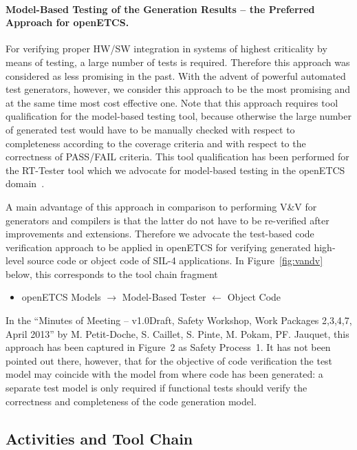 \documentclass[11pt, a4paper]{article}
\begin{document}
 

\paragraph{Model-Based Testing of the Generation Results -- the Preferred Approach for openETCS.}
For verifying proper HW/SW integration in systems of highest criticality by means of testing, a large number of tests is required. Therefore this approach was considered as less promising in the past. With the advent of powerful automated test generators, however, we consider this approach to be the most promising and at the same time most cost effective one. Note that this approach requires tool qualification for the model-based testing tool, because otherwise the large number of generated test would have to be manually checked with respect to completeness according to the coverage criteria and with respect to the correctness of PASS/FAIL criteria. This tool qualification has been performed for the RT-Tester tool which we advocate for model-based testing in the openETCS domain~\cite{rtttq}.

A main advantage of this approach in comparison to performing V\&V for generators and compilers is that the latter do not have to be re-verified after improvements and extensions. Therefore we advocate the test-based code verification approach to be applied in openETCS for verifying generated high-level source code or object code of SIL-4 applications. In Figure~\ref{fig:vandv} below, this corresponds to the tool chain fragment 
\begin{itemize}
\item openETCS Models $\rightarrow$ Model-Based Tester $\leftarrow$ Object Code
\end{itemize}

In the ``Minutes of Meeting – v1.0Draft, Safety Workshop, Work Packages 2,3,4,7, April 2013'' by M. Petit-Doche, S. Caillet, S. Pinte, M. Pokam, PF. Jauquet, this approach has been captured in Figure~2 as Safety Process~1. It has not been pointed out there, however, that for the objective of code verification the test model may coincide with the model from where code has been generated: a separate test model is only required if functional tests should verify the correctness and completeness of the code generation model.



\subsection{Activities and Tool Chain}\label{sec:activitychain}
\end{document}
